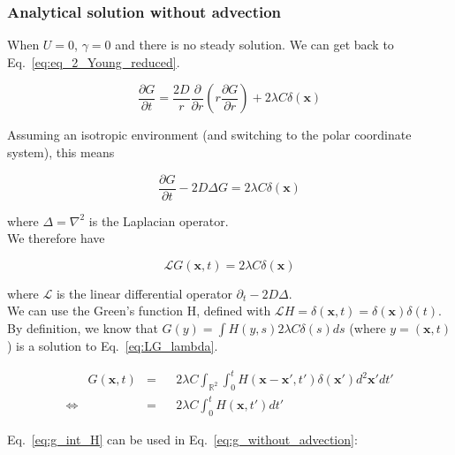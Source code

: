 \subsubsection*{Analytical solution without advection}

When $U=0$, $\gamma=0$ and there is no steady solution. We can get
back to Eq.~\ref{eq:eq_2_Young_reduced}.

\begin{equation}
\frac{\partial G}{\partial t}=\frac{2D}{r}\frac{\partial}{\partial r}\left(r\frac{\partial G}{\partial r}\right)+2\lambda C\delta(\boldsymbol{x})\label{eq:g_without_advection}
\end{equation}

Assuming an isotropic environment (and switching to the polar coordinate system), this means

\begin{equation}
\frac{\partial G}{\partial t}-2D\Delta G=2\lambda C\delta(\boldsymbol{x})
\end{equation}

where $\Delta=\nabla^{2}$ is the Laplacian operator. \\

We therefore have 

\begin{equation}
\mathcal{L}G(\boldsymbol{x},t)=2\lambda C\delta(\boldsymbol{x})\label{eq:LG_lambda}
\end{equation}

where $\mathcal{L}$ is the linear differential operator $\partial_{t}-2D\Delta$. \\

We can use the Green's function H, defined with $\mathcal{L}H=\delta(\boldsymbol{x},t)=\delta(\boldsymbol{x})\delta(t)$. \\

By definition, we know that $G(y)=\int H(y,s)2\lambda C\delta(s)ds$
(where $y=(\boldsymbol{x},t)$) is a solution to Eq.~\ref{eq:LG_lambda}.

\begin{align}
 & G(\boldsymbol{x},t) & = & & 2\lambda C\int_{\mathbb{R}^{2}}\int_{0}^{t}H(\boldsymbol{x}-\boldsymbol{x}',t')\delta(\boldsymbol{x}')d^2\boldsymbol{x}'dt'\nonumber \\
\Leftrightarrow &  & = &  & 2\lambda C\int_{0}^{t}H(\boldsymbol{x},t')dt'\label{eq:g_int_H}
\end{align}

Eq.~\ref{eq:g_int_H} can be used in Eq.~\ref{eq:g_without_advection}:


